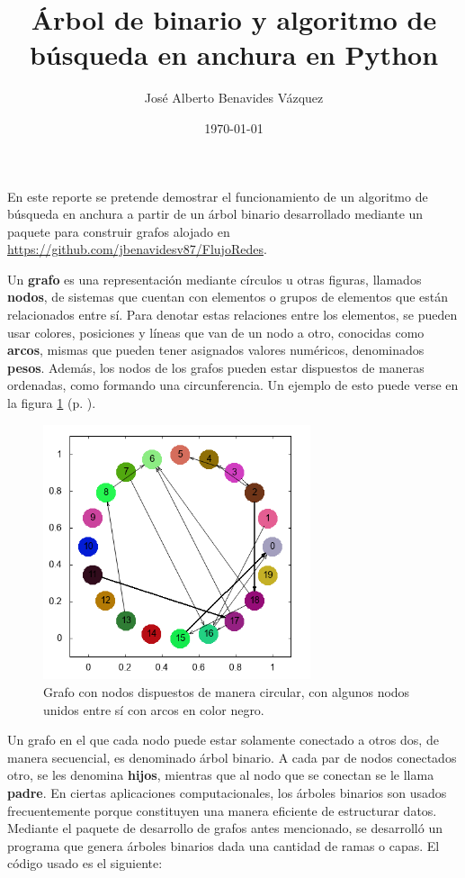 \documentclass{article}
\title{Árbol de binario y algoritmo de búsqueda en anchura en Python}
\author{José Alberto Benavides Vázquez}
\date{\today}
\begin{document}
  \maketitle

  En este reporte se pretende demostrar el funcionamiento de un algoritmo de búsqueda en anchura a partir de un árbol binario desarrollado mediante un paquete para construir grafos alojado en \url{https://github.com/jbenavidesv87/FlujoRedes}.

  Un \textbf{grafo} es una representación mediante círculos u otras figuras, llamados \textbf{nodos}, de sistemas que cuentan con elementos o grupos de elementos que están relacionados entre sí. Para denotar estas relaciones entre los elementos, se pueden usar colores, posiciones y líneas que van de un nodo a otro, conocidas como \textbf{arcos}, mismas que pueden tener asignados valores numéricos, denominados \textbf{pesos}. Además, los nodos de los grafos pueden estar dispuestos de maneras ordenadas, como formando una circunferencia. Un ejemplo de esto puede verse en la figura \ref{grafoCircular} (p. \pageref{grafoCircular}).

  \begin{figure}[h]
    \includegraphics[width=0.7\textwidth]{grafoCircular}
    \centering
    \caption{Grafo con nodos dispuestos de manera circular, con algunos nodos unidos entre sí con arcos en color negro.}
    \label{grafoCircular}
  \end{figure}

  Un grafo en el que cada nodo puede estar solamente conectado a otros dos, de manera secuencial, es denominado árbol binario. A cada par de nodos conectados otro, se les denomina \textbf{hijos}, mientras que al nodo que se conectan se le llama \textbf{padre}. En ciertas aplicaciones computacionales, los árboles binarios son usados frecuentemente porque constituyen una manera eficiente de estructurar datos\cite{artComputerProgramming}. Mediante el paquete de desarrollo de grafos antes mencionado, se desarrolló un programa que genera árboles binarios dada una cantidad de ramas o capas. El código usado es el siguiente:
\end{document}
